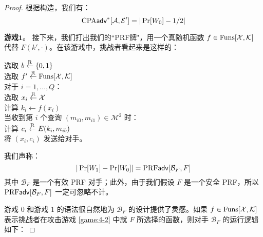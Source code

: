 \begin{proof}
\vspace{5pt}

根据构造，我们有：
\begin{equation}\label{eq:5-7}
{\rm CPA}\mathsf{adv}^*[\mathcal{A},\mathcal{E}']= |\Pr[W_0]-{1}/{2}|
\end{equation}


\noindent\textbf{游戏$\mathbf{1}$}。
接下来，我们打出我们的``PRF牌"，用一个真随机函数 $f\in{\rm Funs}[\mathcal{X},\mathcal{K}]$ 代替 $F(k',\cdot)$。在该游戏中，挑战者看起来是这样的：

\vspace{5pt}

\hspace*{5pt} 选取 $b\overset{\rm R}\leftarrow\{0,1\}$\\
\hspace*{26pt} 选取 $f'\overset{\rm R}\leftarrow{\rm Funs}[\mathcal{X},\mathcal{K}]$\\
\hspace*{26pt} 对于 $i=1,\dots,Q$：\\
\hspace*{50pt} 选取 $x_i\overset{\rm R}\leftarrow\mathcal{X}$\\
\hspace*{47pt} \colorbox{gray!50}{计算 $k_i\leftarrow f(x_i)$}\\
\hspace*{26pt} 当收到第 $i$ 个查询 $(m_{i0},m_{i1})\in\mathcal{M}^2$ 时：\\
\hspace*{50pt} 计算 $c_i\overset{\rm R}\leftarrow E(k_i,m_{ib})$\\
\hspace*{50pt} 将 $(x_i,c_i)$ 发送给对手。

\vspace{5pt}

我们声称：
\begin{equation}\label{eq:5-8}
|\Pr[W_1]-\Pr[W_0]|={\rm PRF}\mathsf{adv}[\mathcal{B}_F,F]
\end{equation}
其中 $\mathcal{B}_F$ 是一个有效 PRF 对手；此外，由于我们假设 $F$ 是一个安全 PRF，所以 ${\rm PRF}\mathsf{adv}[\mathcal{B}_F,F]$ 一定可忽略不计。

游戏 $0$ 和游戏 $1$ 的语法很自然地为 $\mathcal{B}_F$ 的设计提供了灵感。如果 $f\in{\rm Funs}[\mathcal{X},\mathcal{K}]$ 表示挑战者在攻击游戏 \ref{game:4-2} 中就 $F$ 所选择的函数，则对手 $\mathcal{B}_F$ 的运行逻辑如下：

\vspace{5pt}


\end{proof}
